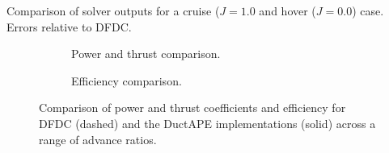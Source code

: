 \begin{table}[h!]
    \caption{Comparison of solver outputs for a cruise (\(J=1.0\) and hover (\(J=0.0\)) case. Errors relative to DFDC.}
    \begin{subtable}[t]{0.35\textwidth}
        \begin{center}
            
        \end{center}
    \end{subtable}
\hfill
    \begin{subtable}[t]{0.45\textwidth}
        \begin{center}
            
        \end{center}
    \end{subtable}
    \label{tab:dfdccompsinglerotor}
\end{table}

\begin{figure}[h!]
     \centering
     \begin{subfigure}[t]{0.45\textwidth}
         \centering
{}
        
        \caption{Power and thrust comparison.}
        \label{fig:singlerotorcpct}
     \end{subfigure}
     \hfill
     \begin{subfigure}[t]{0.45\textwidth}
         \centering
{}
         
         \caption{Efficiency comparison.}
        \label{fig:singlerotoreta}
     \end{subfigure}
    \caption{Comparison of power and thrust coefficients and efficiency for DFDC (dashed) and the DuctAPE implementations (solid) across a range of advance ratios.}
    \label{fig:singlerotorcpcteta}
\end{figure}
